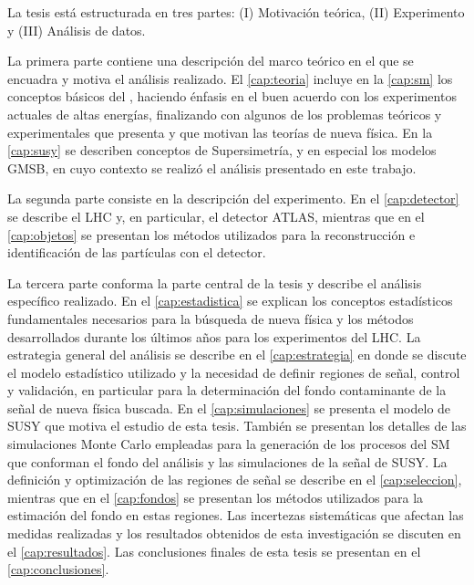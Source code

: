 La tesis está estructurada en tres partes: (I) Motivación teórica, (II) Experimento
y (III) Análisis de datos.

La primera parte contiene una descripción del marco teórico en
el que se encuadra y motiva el análisis realizado. El \cref{cap:teoria} incluye en la
\cref{cap:sm} los conceptos básicos del {\SM}, haciendo énfasis en el buen
acuerdo con los experimentos actuales de altas energías, finalizando con algunos
de los problemas teóricos y experimentales que presenta y que motivan las
teorías de nueva física. En la \cref{cap:susy} se describen conceptos de
Supersimetría, y en especial los modelos GMSB, en cuyo contexto se realizó el
análisis presentado en este trabajo.

La segunda parte consiste en la descripción del experimento. En el
\cref{cap:detector} se describe el LHC y, en particular, el detector ATLAS,
mientras que en el \cref{cap:objetos} se presentan los métodos utilizados para
la reconstrucción e identificación de las partículas con el detector.

La tercera parte conforma la parte central de la tesis y describe el análisis
específico realizado. En el \cref{cap:estadistica} se explican los conceptos
estadísticos fundamentales necesarios para la búsqueda de nueva física y los
métodos desarrollados durante los últimos a\~nos para los experimentos del LHC.
La estrategia general del análisis se describe en el \cref{cap:estrategia} en
donde se discute el modelo estadístico utilizado y la necesidad de definir
regiones de señal, control y validación, en particular para la determinación del
fondo contaminante de la señal de nueva física buscada.
En el \cref{cap:simulaciones} se presenta el modelo de SUSY que motiva el
estudio de esta tesis. También se presentan los detalles de las simulaciones
Monte Carlo empleadas para la generación de los procesos del SM que conforman el
fondo del análisis y las simulaciones de la señal de SUSY.
La definición y optimización de las regiones de señal se describe en el
\cref{cap:seleccion}, mientras que en el \cref{cap:fondos} se presentan los
métodos utilizados para la estimación del fondo en estas regiones.
Las incertezas sistemáticas que afectan las medidas
realizadas y los resultados obtenidos de esta investigación se discuten en el
\cref{cap:resultados}. Las conclusiones finales de esta tesis se presentan en el
\cref{cap:conclusiones}.

